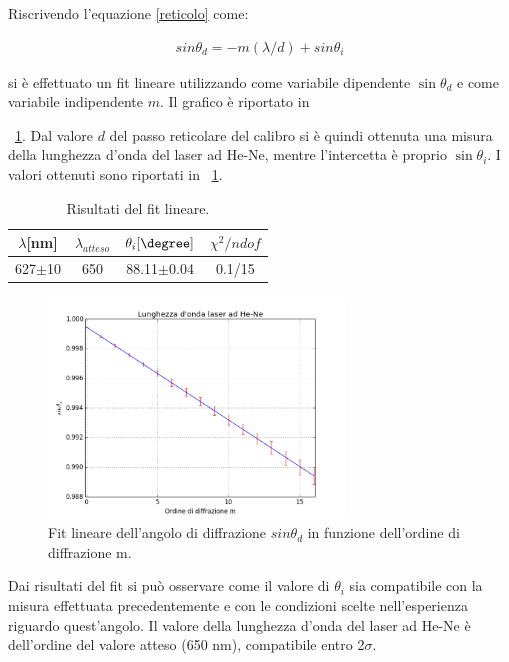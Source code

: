 \documentclass[a4paper,10pt]{article}
\begin{document}
{{{Riscrivendo l'equazione \eqref{reticolo} come:

\begin{align*}
sin\theta_d = - m(\lambda/d) + sin\theta_i
\end{align*} 
  
si è effettuato un fit lineare utilizzando come variabile dipendente $\sin\theta_d$ e come variabile indipendente $m$. Il grafico è riportato in \figurename{~\ref{fig:fita}.
Dal valore $d$ del passo reticolare del calibro si è quindi ottenuta una misura della lunghezza d'onda del laser ad He-Ne, mentre l'intercetta è proprio $\sin\theta_i$. I valori ottenuti sono riportati in \tablename{~\ref{tab:fita}}.


\begin{table}[H]
	\centering
	\begin{tabular}{c|c|c|c}
$\lambda$[nm] &$\lambda_{atteso}$ &$\theta_i[\degree]$& $\chi^2/ndof$ \\
\hline
627$\pm$10 & 650 & 88.11$\pm$0.04 & 0.1/15\\
\hline
	\end{tabular}
\caption{Risultati del fit lineare.}
\label{tab:fita}
\end{table}


\begin{figure}[H]
	\centering
	\includegraphics[width=0.7\textwidth]{../grafici/fita.png}
	\caption{Fit lineare dell'angolo di diffrazione $sin\theta_d$ in funzione dell'ordine di diffrazione m.}
	\label{fig:fita}
\end{figure}


Dai risultati del fit si può osservare come il valore di $\theta_i$ sia compatibile con la misura effettuata precedentemente e con le condizioni scelte nell'esperienza riguardo quest'angolo.
Il valore della lunghezza d'onda del laser ad He-Ne è dell'ordine del valore atteso (650 nm), compatibile entro 2$\sigma$.

}}}}
\end{document}
